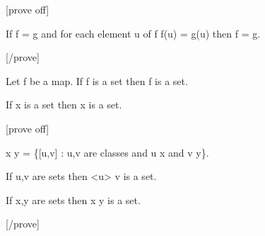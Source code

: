 \documentclass[a4paper,draft]{amsproc}
\begin{document}
\begin{forthel}

[prove off]
\begin{theorem}[71]
If \domain f = \domain g and for each element u of \domain f f(u) = g(u) then f = g.
\end{theorem}
[/prove]

\begin{axiom}[V]
Let f be a map. If \domain f is a set then \range f is a set.
\end{axiom}

\begin{axiom}[VI]
If x is a set then \bigcup x is a set.
\end{axiom}

[prove off]
\begin{definition}[72]
 x \times y = \{[u,v] : u,v are classes and u \in x and v \in y\}.
\end{definition}

\begin {theorem}[73]
If u,v are sets then <u> \times v is a set.
\end{theorem}

\begin{theorem}[74]
If x,y are sets then x \times y is a set.
\end{theorem}
[/prove]


\end{forthel}
\end{document}
